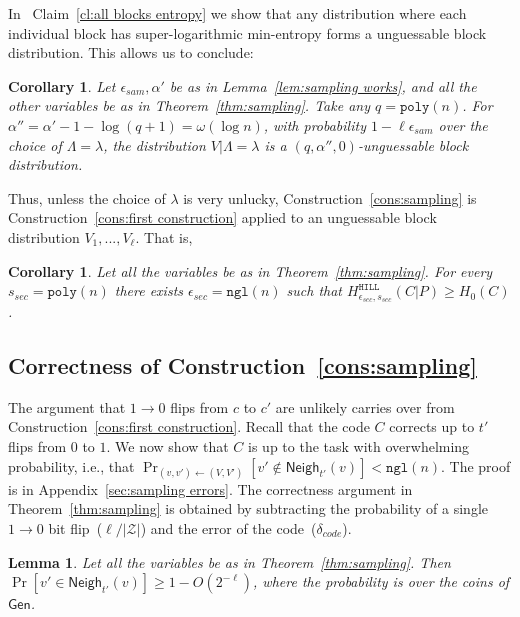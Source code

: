 \documentclass[11pt]{article}
\newcommand{\apref}[1]{\mbox{Appendix~\ref{#1}}}
\newcommand{\thref}[1]{\mbox{Theorem~\ref{#1}}}
\newcommand{\corref}[1]{\mbox{Corollary~\ref{#1}}}
\newcommand{\lemref}[1]{\mbox{Lemma~\ref{#1}}}
\newcommand{\clref}[1]{\mbox{Claim~\ref{#1}}}
\newcommand{\consref}[1]{\mbox{Construction~\ref{#1}}}
\newcommand{\class}[1]{{\ensuremath{\mathsf{#1}}}}
\newcommand{\gen}{\ensuremath{\class{Gen}}\xspace}
\newcommand{\neigh}{\ensuremath{\class{Neigh}}\xspace}
\newcommand{\hill}{\ensuremath{\mathtt{HILL}}\xspace}
\newcommand{\poly}{\ensuremath{\mathtt{poly}}\xspace}
\newcommand{\ngl}{\ensuremath{\mathtt{ngl}}\xspace}
\newtheorem{lemma}[theorem]{Lemma}
\newtheorem{corollary}[theorem]{Corollary}
\begin{document}
In ~\clref{cl:all blocks entropy} we show that any distribution where each individual block has super-logarithmic min-entropy forms a unguessable block distribution.  This allows us to conclude:
\begin{corollary}
\label{cor:v are unguessable}
Let $\epsilon_{sam}, \alpha'$ be as in \lemref{lem:sampling works},  and all the other variables be as in \thref{thm:sampling}. Take any $q=\poly(n)$.  For $\alpha'' =\alpha'-1-\log (q+1) =  \omega(\log n)$, with  probability $1-\ell \epsilon_{sam}$ over the choice of $\Lambda=\lambda$, the distribution $V| \Lambda=\lambda$ is a $(q, \alpha'', 0)$-unguessable block distribution.
\end{corollary}


Thus, unless the choice of $\lambda$ is very unlucky,
\consref{cons:sampling} is \consref{cons:first construction} applied to an unguessable block distribution $V_1,..., V_\ell$. That is,
\begin{corollary}
\label{cor:samp unguess}
Let all the variables be as in \thref{thm:sampling}.
For every $s_{sec} = \poly(n)$ there exists $\epsilon_{sec} = \ngl(n)$ such that $H^{\hill}_{\epsilon_{sec}, s_{sec}}(C | P) \geq H_0(C)$. %
\end{corollary}

\subsection{Correctness of \consref{cons:sampling}}
\label{sec:correct sampling}
The argument that $1\rightarrow 0$ flips from $c$ to $c'$ are unlikely carries over from \consref{cons:first construction}.  Recall that the code $C$ corrects up to $t'$ flips from $0$ to $1$. We now show that $C$ is up to the task with overwhelming probability, i.e., that  $\Pr_{(v, v')\leftarrow (V, V')}[v'\not\in\neigh_{t'}(v)] <\ngl(n)$.  The proof is in \apref{sec:sampling errors}.  The correctness argument in \thref{thm:sampling} is obtained by subtracting the probability of a single $1\rightarrow 0$ bit flip~($\ell/|\mathcal{Z}|$) and the error of the code~($\delta_{code}$).

\begin{lemma}
\label{lem:sampling errors}
Let all the variables be as in \thref{thm:sampling}.
 Then $\Pr[v'\in\neigh_{t'}(v)]\geq 1-O(2^{-\ell})$, where the probability is over the coins of $\gen$.  %
\end{lemma}
\end{document}
